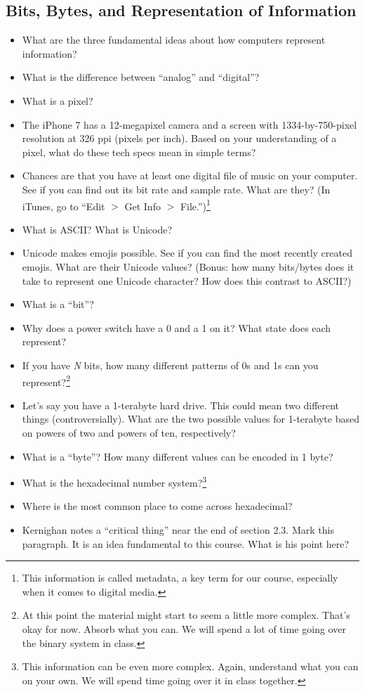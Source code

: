 \documentclass[12pt]{article}
\begin{document}
\subsection*{Bits, Bytes, and Representation of Information}
\begin{itemize}
	\item What are the three fundamental ideas about how computers represent information?
	\item What is the difference between ``analog'' and ``digital''?
	\item What is a pixel?
	\item The iPhone 7 has a 12-megapixel camera and a screen with 1334-by-750-pixel resolution at 326 ppi (pixels per inch). Based on your understanding of a pixel, what do these tech specs mean in simple terms?
	\item Chances are that you have at least one digital file of music on your computer. See if you can find out its bit rate and sample rate. What are they? (In iTunes, go to ``Edit $>$ Get Info $>$ File.'')\footnote{This information is called metadata, a key term for our course, especially when it comes to digital media.}
	\item What is ASCII? What is Unicode?
	\item Unicode makes emojis possible. See if you can find the most recently created emojis. What are their Unicode values? (Bonus: how many bits/bytes does it take to represent one Unicode character? How does this contrast to ASCII?)
	\item What is a ``bit''?
	\item Why does a power switch have a 0 and a 1 on it? What state does each represent?
	\item If you have \textit{N} bits, how many different patterns of 0s and 1s can you represent?\footnote{At this point the material might start to seem a little more complex. That's okay for now. Absorb what you can. We will spend a lot of time going over the binary system in class.}
	\item Let's say you have a 1-terabyte hard drive. This could mean two different things (controversially). What are the two possible values for 1-terabyte based on powers of two and powers of ten, respectively?
	\item What is a ``byte''? How many different values can be encoded in 1 byte?
	\item What is the hexadecimal number system?\footnote{This information can be even more complex. Again, understand what you can on your own. We will spend time going over it in class together.}
	\item Where is the most common place to come across hexadecimal?
	\item Kernighan notes a ``critical thing'' near the end of section 2.3. Mark this paragraph. It is an idea fundamental to this course. What is his point here?
\end{itemize}
\end{document}
